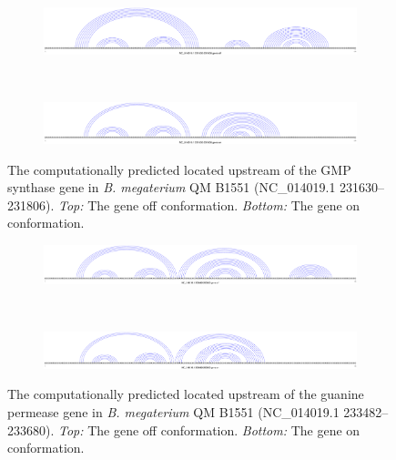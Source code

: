 \begin{figure}[!ht]
\centering
\begin{subfigure}[h]{\textwidth}
\centering
\includegraphics[width=.9\textwidth]{Figures/Ribofinder/NC_014019_1_231630_231806_OFF.pdf}
\end{subfigure} \\
\medskip
\begin{subfigure}[h]{\textwidth}
\centering
\includegraphics[width=.9\textwidth]{Figures/Ribofinder/NC_014019_1_231630_231806_ON.pdf}
\end{subfigure}
\caption{The computationally predicted \rb located upstream of the GMP synthase
gene in {\em B. megaterium} QM B1551 (NC\_014019.1 231630--231806).
{\em Top:} The gene off conformation. {\em Bottom:} The gene on conformation.}
\label{fig:figure:NC_014019_1_231630_231806}
\end{figure}
\medskip

\begin{figure}[!ht]
\centering
\begin{subfigure}[h]{\textwidth}
\centering
\includegraphics[width=.9\textwidth]{Figures/Ribofinder/NC_014019_1_233482_233680_OFF.pdf}
\end{subfigure} \\
\medskip
\begin{subfigure}[h]{\textwidth}
\centering
\includegraphics[width=.9\textwidth]{Figures/Ribofinder/NC_014019_1_233482_233680_ON.pdf}
\end{subfigure}
\caption{The computationally predicted \rb located upstream of the guanine permease
gene in {\em B. megaterium} QM B1551 (NC\_014019.1 233482--233680).
{\em Top:} The gene off conformation. {\em Bottom:} The gene on conformation.}
\label{fig:figure:NC_014019_1_233482_233680}
\end{figure}
\medskip

